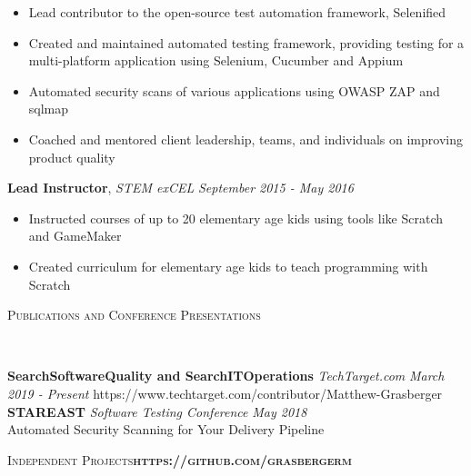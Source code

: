 \documentclass[9pt]{article}
\newenvironment{changemargin}[2]{%
  \begin{list}{}{%
    \setlength{\topsep}{0pt}%
    \setlength{\leftmargin}{#1}%
    \setlength{\rightmargin}{#2}%
    \setlength{\listparindent}{\parindent}%
    \setlength{\itemindent}{\parindent}%
    \setlength{\parsep}{\parskip}%
  }%
  \item[]}{\end{list}
}
\newcommand{\lineover}{
	\begin{changemargin}{-0.05in}{-0.05in}
		\vspace*{-8pt}
		\hrulefill \\
		\vspace*{-2pt}
	\end{changemargin}
}
\newcommand{\header}[1]{
	\begin{changemargin}{-0.5in}{-0.5in}
		\scshape{#1}\\
  	\lineover
	\end{changemargin}
}
\newenvironment{body} {
	\vspace*{-10pt}
	\begin{changemargin}{-0.25in}{-0.5in}
  }	
	{\end{changemargin}
}
\begin{document}
\begin{body}
	\vspace*{-4pt}
	\begin{itemize} \itemsep -0pt  %
		\item  Lead contributor to the open-source test automation framework, Selenified
		\item  Created and maintained automated testing framework, providing testing for a multi-platform application using Selenium, Cucumber and Appium
		\item  Automated security scans of various applications using OWASP ZAP and sqlmap
		\item  Coached and mentored client leadership, teams, and individuals on improving product quality
	\end{itemize}
	
	\textbf{Lead Instructor}, \emph{STEM exCEL} \hfill \emph{September 2015 - May 2016}\\
	\vspace*{-4pt}
	\begin{itemize} \itemsep -0pt  %
		\item  Instructed courses of up to 20 elementary age kids using tools like Scratch and GameMaker
		\item  Created curriculum for elementary age kids to teach programming with Scratch 
	\end{itemize}		
	
\end{body}
\vspace{10pt}	
\smallskip
\header{Publications and Conference Presentations}

\begin{body}
	\vspace{14pt}
        \textbf{SearchSoftwareQuality and SearchITOperations }\emph{TechTarget.com} \hfill \emph{March 2019 - Present}{} https://www.techtarget.com/contributor/Matthew-Grasberger\\
	\smallskip
	\vspace{4pt}
	\textbf{STAREAST }\emph{Software Testing Conference} \hfill \emph{May 2018}{}\\
	Automated Security Scanning for Your Delivery Pipeline
	\vspace{4pt}
\end{body}
\vspace{10pt}
\smallskip
\header{Independent Projects\hfill \textbf{https://github.com/grasbergerm}}
\end{document}
